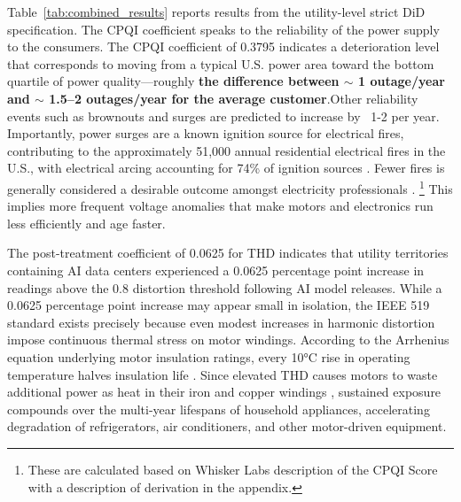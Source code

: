 \documentclass[a4paper,fleqn,longmktitle]{cas-sc}
\newcommand{\nb}[1]{\textcolor{blue}{NB[#1]}}
\begin{document}
Table~\ref{tab:combined_results} reports results from the utility-level strict DiD specification. The CPQI coefficient speaks to the reliability of the power supply to the consumers. The CPQI coefficient of 0.3795 indicates a deterioration level that corresponds to moving from a typical U.S. power area toward the bottom quartile of power quality—roughly \textbf{the difference between $\sim$ 1 outage/year and $\sim$ 1.5–2 outages/year for the average customer}.Other reliability events such as brownouts and surges are predicted to increase by ~1-2 per year. Importantly, power surges are a known ignition source for electrical fires, contributing to the approximately 51,000 annual residential electrical fires in the U.S., with electrical arcing accounting for 74\% of ignition sources \cite{usfa2019electrical}. Fewer fires is generally considered a desirable outcome amongst electricity professionals \cite{Laughner2024THD}.
\footnote{These are calculated based on Whisker Labs description of the CPQI Score with a description of derivation in the appendix.} This implies more frequent voltage anomalies that make motors and electronics run less efficiently and age faster.



The post-treatment coefficient of 0.0625 for THD indicates that utility territories containing AI data centers experienced a 0.0625 percentage point increase in readings above the 0.8 distortion threshold following AI model releases. 
While a 0.0625 percentage point increase may appear small in isolation, the IEEE 519 standard exists precisely because even modest increases in harmonic distortion impose continuous thermal stress on motor windings. According to the Arrhenius equation underlying motor insulation ratings, every 10°C rise in operating temperature halves insulation life \cite{NEMA_MG1}. Since elevated THD causes motors to waste additional power as heat in their iron and copper windings \cite{Laughner2024THD}, sustained exposure compounds over the multi-year lifespans of household appliances, accelerating degradation of refrigerators, air conditioners, and other motor-driven equipment.
\end{document}
